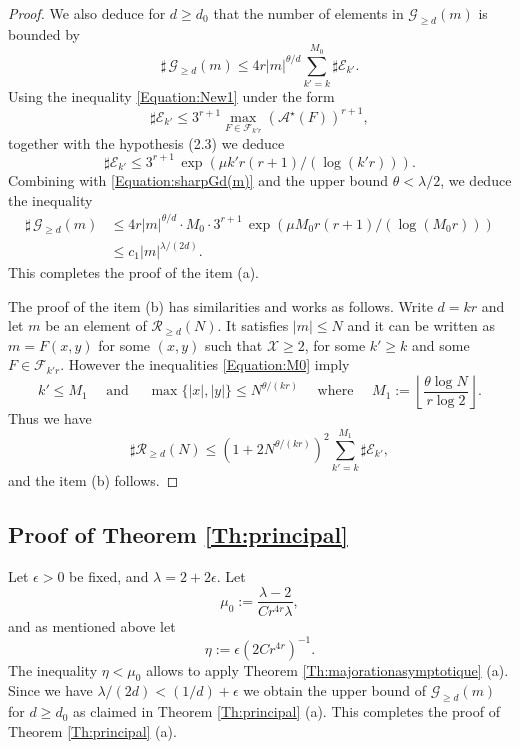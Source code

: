 \documentclass[10pt]{article}
\theoremstyle{definition}
\numberwithin{equation}{section}
\begin{document}
\begin{proof}
We also deduce for $d\geqslant d_0$ that the number of elements in $\mathcal G_{\geqslant d} (m)$ is bounded by
\begin{equation}\label{Equation:sharpGd(m)}
\sharp \, \mathcal G_{\geqslant d} (m) \leqslant 4r \vert m \vert^{\theta/d} \sum_{k'=k}^{M_0} \sharp \mathcal E_{k'}. 
\end{equation}
Using the inequality \eqref{Equation:New1} under the form 
\[
\sharp \mathcal E_{k'} \leqslant 3^{r+1} \max_{F\in \mathcal F_{k'r}} (\mathcal A^\star(F))^{r+1},
\]
together with the hypothesis (2.3) we deduce 
\[
\sharp \mathcal E_{k'} \leqslant 3^{r+1}\, \exp \left(\mu k' r(r+1) /(\log (k'r))\right). 
\]
Combining with \eqref{Equation:sharpGd(m)} and the upper bound $\theta<\lambda/2$, we deduce 
the inequality
\begin{align*}
\sharp \, \mathcal G_{\geqslant d} (m) &\leqslant 4r \vert m \vert^{\theta/d} \cdot 
M_0 \cdot 3^{r+1}\, \exp \left(\mu M_0 r(r+1) /(\log (M_0r))\right) \\
& \leqslant c_1 \vert m\vert^{\lambda/(2d)}.
\end{align*} 
This completes the proof of the item (a).

The proof of the item (b) has similarities and works as follows. Write $d=kr$ and let $m$ be an element of $\mathcal R_{\geqslant d}(N)$.
It satisfies $\vert m \vert \leqslant N$ and it can be written as 
$m= F(x,y)$ for some $(x,y)$ such that $ \mathcal X \geqslant 2$, for some $k'\geqslant k$ and some $F\in \mathcal F_{k'r}$.
However the inequalities \eqref{Equation:M0} imply
\[
k'\leqslant M_1\quad \text{ and } \quad \max\{|x|,|y|\} \leqslant N^{\theta/(kr)}
\quad \text{ where } \quad 
M_1:=
\left\lfloor
 \frac{\theta \log N}{r\log 2} \right\rfloor.
\]
Thus we have
\[
\sharp \mathcal R_{\geqslant d} (N)\leqslant \left(1+2 N^{\theta/(kr)}\right)^2 \sum_{k'=k}^{M_1} \sharp \mathcal E_{k'},
\]
and the item (b) follows.
\end{proof}
 

 \subsection{Proof of Theorem \ref{Th:principal}}\label{Subsection:ProofPrincipal}
 
 Let $\epsilon >0$ be fixed, and $\lambda = 2+2\epsilon$. Let 
\[
\mu_0 := \frac{ \lambda -2}{C r^{4r} \lambda},
\]
and as mentioned above let 
\[
\eta := \epsilon (2Cr^{4r})^{-1}.
\]
The inequality $\eta < \mu_0$ allows to apply Theorem \ref{Th:majorationasymptotique} (a). Since we have $\lambda /(2d) < (1/d)+\epsilon$
we obtain the upper bound of $\mathcal G_{\geqslant d} (m)$ for $d\geqslant d_0$ as claimed in Theorem \ref{Th:principal} (a).
This completes the proof of Theorem \ref{Th:principal} (a).
\end{document}
